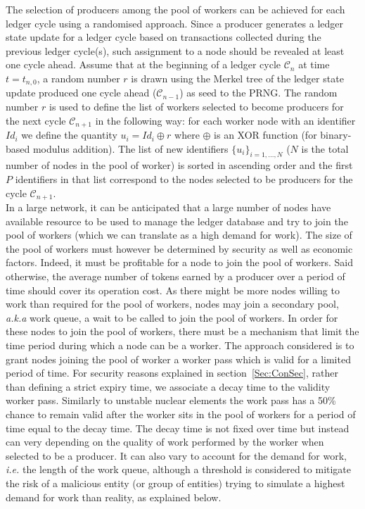 
The selection of producers among the pool of workers can be achieved for each ledger cycle using a randomised approach. Since a producer generates a ledger state update for a ledger cycle based on transactions collected during the previous ledger cycle(s), such assignment to a node should be revealed at least one cycle ahead. Assume that at the beginning of a ledger cycle $\mathcal{C}_n$ at time $t = t_{n,0}$, a random number $r$ is drawn using the Merkel tree of the ledger state update produced one cycle ahead ($\mathcal{C}_{n-1}$) as seed to the PRNG. The random number $r$ is used to define the list of workers selected to become producers for the next cycle $\mathcal{C}_{n+1}$ in the following way: for each worker node with an identifier $Id_i$ we define the quantity $u_i = Id_i \oplus r$ where $\oplus$ is an XOR function (for binary-based modulus addition). The list of new identifiers $\{u_i \}_{i=1,...,N}$ ($N$ is the total number of nodes in the pool of worker) is sorted in ascending order and the first $P$ identifiers in that list correspond to the nodes selected to be producers for the cycle $\mathcal{C}_{n+1}$.\\


In a large network, it can be anticipated that a large number of nodes have available resource to be used to manage the ledger database and try to join the pool of workers (which we can translate as a high demand for work).
The size of the pool of workers must however be determined by security as well as economic factors. Indeed, it must be profitable for a node to join the pool of workers. Said otherwise, the average number of tokens earned by a producer over a period of time should cover its operation cost. As there might be more nodes willing to work than required for the pool of workers, nodes may join a secondary pool, \textit{a.k.a} work queue, a wait to be called to join the pool of workers. In order for these nodes to join the pool of workers, there must be a mechanism that limit the time period during which a node can be a worker. The approach considered is to grant nodes joining the pool of worker a worker pass which is valid for a limited period of time. For security reasons explained in section~\ref{Sec:ConSec}, rather than defining a strict expiry time, we associate a decay time to the validity worker pass. Similarly to unstable nuclear elements the work pass has a 50\% chance to remain valid after the worker sits in the pool of workers for a period of time equal to the decay time. The decay time is not fixed over time but instead can very depending on the quality of work performed by the worker when selected to be a producer. It can also vary to account for the demand for work, \textit{i.e.} the length of the work queue, although a threshold is considered to mitigate the risk of a malicious entity (or group of entities) trying to simulate a highest demand for work than reality, as explained below.\\ 


